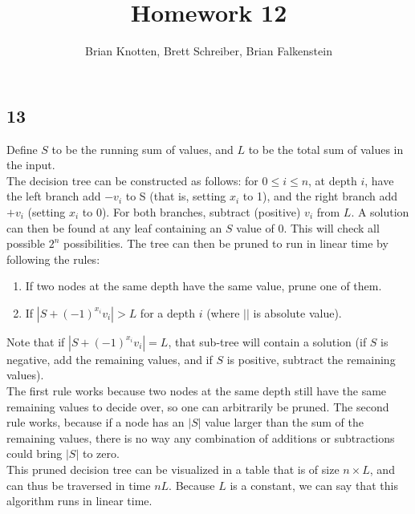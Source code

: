 \documentclass[letterpaper,notitlepage,twoside]{article}
\begin{document}
\title{Homework 12}
\author{Brian Knotten, Brett Schreiber, Brian Falkenstein}
\maketitle

\subsection*{13}
Define $S$ to be the running sum of values, and $L$ to be the total sum of values in the input.\\
The decision tree can be constructed as follows: for $0\leq i \leq n$, at depth $i$, have the left branch add $-v_i$ to S (that is, setting $x_i$ to 1), and the right branch add $+v_i$ (setting $x_i$ to 0). For both branches, subtract (positive) $v_i$ from $L$. A solution can then be found at any leaf containing an $S$ value of 0. This will check all possible $2^n$ possibilities. The tree can then be pruned to run in linear time by following the rules: 
\begin{enumerate}
\item If two nodes at the same depth have the same value, prune one of them. 
\item If $|S+(-1)^{x_i} v_i| > L$ for a depth $i$ (where $||$ is absolute value). 
\end{enumerate}
Note that if $|S+(-1)^{x_i} v_i| = L$, that sub-tree will contain a solution (if $S$ is negative, add the remaining values, and if $S$ is positive, subtract the remaining values). \\
The first rule works because two nodes at the same depth still have the same remaining values to decide over, so one can arbitrarily be pruned. The second rule works, because if a node has an $|S|$ value larger than the sum of the remaining values, there is no way any combination of additions or subtractions could bring $|S|$ to zero. \\
This pruned decision tree can be visualized in a table that is of size $n\times L$, and can thus be traversed in time $nL$. Because $L$ is a constant, we can say that this algorithm runs in linear time. 
\end{document}
